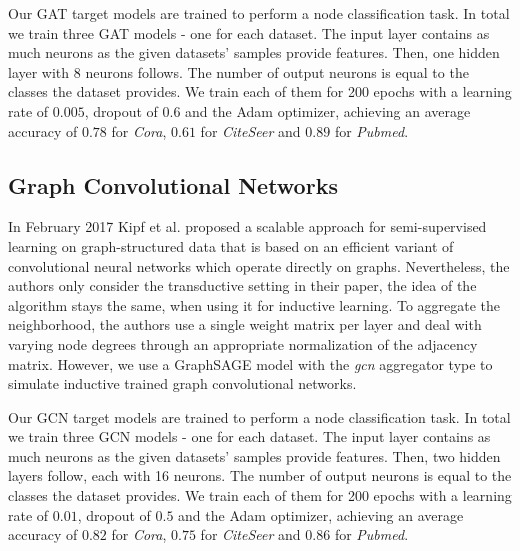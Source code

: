       Our GAT target models are trained to perform a node classification task.
      In total we train three GAT models - one for each dataset.
      The input layer contains as much neurons as the given datasets' samples provide features.
      Then, one hidden layer with 8 neurons follows.
      The number of output neurons is equal to the classes the dataset provides.
      We train each of them for 200 epochs with a learning rate of $0.005$, dropout of $0.6$ and the Adam optimizer, achieving an average accuracy of $0.78$ for \emph{Cora}, $0.61$ for \emph{CiteSeer} and $0.89$ for \emph{Pubmed}.

    \subsection*{Graph Convolutional Networks}
      In February 2017 Kipf et al. \cite{gcn} proposed a scalable approach for semi-supervised learning on graph-structured data that is based on an efficient variant of convolutional neural networks which operate directly on graphs.
      Nevertheless, the authors only consider the transductive setting in their paper, the idea of the algorithm stays the same, when using it for inductive learning.
      To aggregate the neighborhood, the authors use a single weight matrix per layer and deal with varying node degrees through an appropriate normalization of the adjacency matrix.
      However, we use a GraphSAGE model with the \emph{gcn} aggregator type to simulate inductive trained graph convolutional networks.

      Our GCN target models are trained to perform a node classification task.
      In total we train three GCN models - one for each dataset.
      The input layer contains as much neurons as the given datasets' samples provide features.
      Then, two hidden layers follow, each with 16 neurons.
      The number of output neurons is equal to the classes the dataset provides.
      We train each of them for 200 epochs with a learning rate of $0.01$, dropout of $0.5$ and the Adam optimizer, achieving an average accuracy of $0.82$ for \emph{Cora}, $0.75$ for \emph{CiteSeer} and $0.86$ for \emph{Pubmed}. 

